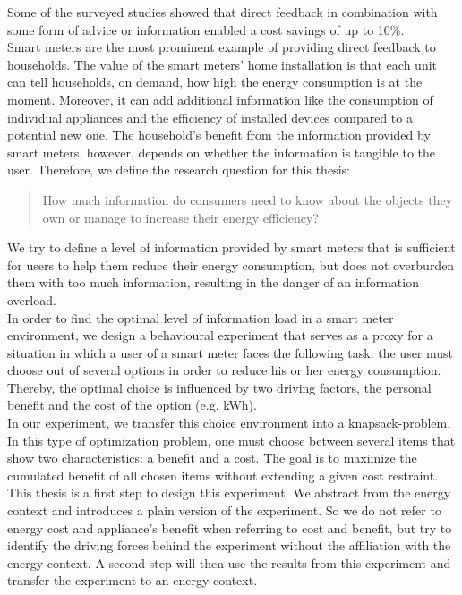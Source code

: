 Some of the surveyed studies showed that direct feedback in combination with some form of advice or information enabled a cost savings of up to 10\%.\\
Smart meters are the most prominent example of providing direct feedback to households. The value of the smart meters' home installation is that each unit can tell households, on demand, how high the energy consumption is at the moment. Moreover, it can add additional information like the consumption of individual appliances and the efficiency of installed devices compared to a potential new one. The household's benefit from the information provided by smart meters, however, depends on whether the information is tangible to the user.
Therefore, we define the research question for this thesis:
\begin{quotation}
How much information do consumers need to know about the objects they own or manage to increase their energy efficiency? 
\end{quotation}
We try to define a level of information provided by smart meters that is sufficient for users to help them reduce their energy consumption, but does not overburden them with too much information, resulting in the danger of an information overload.\\
In order to find the optimal level of information load in a smart meter environment, we design a behavioural experiment that serves as a proxy for a situation in which a user of a smart meter faces the following task: the user must choose out of several options in order to reduce his or her energy consumption. Thereby, the optimal choice is influenced by two driving factors, the personal benefit and the cost of the option (e.g. kWh).\\
In our experiment, we transfer this choice environment into a knapsack-problem. In this type of optimization problem, one must choose between several items that show two characteristics: a benefit and a cost. The goal is to maximize the cumulated benefit of all chosen items without extending a given cost restraint.\\ 
This thesis is a first step to design this experiment. We abstract from the energy context and introduces a plain version of the experiment. So we do not refer to energy cost and appliance's benefit when referring to cost and benefit, but try to identify the driving forces behind the experiment without the affiliation with the energy context. A second step will then use the results from this experiment and transfer the experiment to an energy context.\\ 

